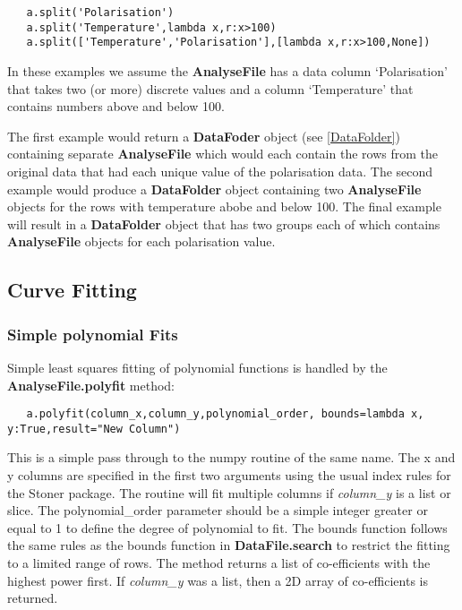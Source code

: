 \documentclass[a4paper,11pt]{scrartcl}
\begin{document}
\begin{lstlisting}
   a.split('Polarisation')
   a.split('Temperature',lambda x,r:x>100)
   a.split(['Temperature','Polarisation'],[lambda x,r:x>100,None])
\end{lstlisting}

In these examples we assume the \textbf{AnalyseFile} has a data column `Polarisation' that takes two (or more) discrete values
and a column `Temperature' that contains numbers above and below 100.

The first example would return a \textbf{DataFoder} object (see \ref{DataFolder}) containing separate \textbf{AnalyseFile} which
would each contain the rows from the original data that had each unique value of the polarisation data. The second example would
produce a \textbf{DataFolder} object containing two \textbf{AnalyseFile} objects for the rows with temperature abobe and below 100.
The final example will result in a \textbf{DataFolder} object that has two groups each of which contains \textbf{AnalyseFile} objects for each
polarisation value.

\subsection{Curve Fitting}

\subsubsection{Simple polynomial Fits}

Simple least squares fitting of polynomial functions is handled by the
\textbf{AnalyseFile.polyfit} method:

\begin{lstlisting}
   a.polyfit(column_x,column_y,polynomial_order, bounds=lambda x, y:True,result="New Column")
\end{lstlisting}

This is a simple pass through to the numpy routine of the same name. The x and y
columns are specified in the first two arguments using the usual index rules for
the Stoner package. The routine will fit multiple columns if \textit{column\_y}
is a list or slice. The polynomial\_order parameter should be a simple integer
greater or equal to 1 to define the degree of polynomial to fit. The bounds
function follows the same rules as the bounds function in
\textbf{DataFile.search} to restrict the fitting to a limited range of rows. The
method returns a list of co-efficients with the highest power first. If
\textit{column\_y} was a list, then a 2D array of co-efficients is returned.
\end{document}
